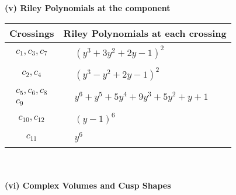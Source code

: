 \documentclass[1p]{elsarticle_modified}
\theoremstyle{definition}
\begin{document}
\newpage\renewcommand{\arraystretch}{1}
\flushleft \textbf{(v) Riley Polynomials at the component}\newline \\
\begin{tabular}{m{50pt}|m{274pt}}
Crossings & \hspace{64pt}Riley Polynomials at each crossing \\
\hline $$\begin{aligned}c_{1},c_{3},c_{7}\end{aligned}$$&$\begin{aligned}
&(y^3+3 y^2+2 y-1)^2
\end{aligned}$\\
\hline $$\begin{aligned}c_{2},c_{4}\end{aligned}$$&$\begin{aligned}
&(y^3- y^2+2 y-1)^2
\end{aligned}$\\
\hline $$\begin{aligned}c_{5},c_{6},c_{8}\\c_{9}\end{aligned}$$&$\begin{aligned}
&y^6+y^5+5 y^4+9 y^3+5 y^2+y+1
\end{aligned}$\\
\hline $$\begin{aligned}c_{10},c_{12}\end{aligned}$$&$\begin{aligned}
&(y-1)^6
\end{aligned}$\\
\hline $$\begin{aligned}c_{11}\end{aligned}$$&$\begin{aligned}
&y^6
\end{aligned}$\\
\hline
\end{tabular}\\~\\
\newpage\flushleft \textbf{(vi) Complex Volumes and Cusp Shapes}
\end{document}
